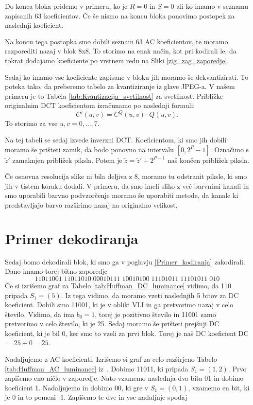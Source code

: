 \documentclass[a4paper,12pt,openright]{book}
\begin{document}
Do konca bloka pridemo v primeru, ko je $R = 0$ in $S = 0$ ali ko imamo v seznamu zapisanih 63 koeficientov. Če še nismo na koncu bloka ponovimo postopek za naslednji koeficient.\par
Na koncu tega postopka smo dobili seznam 63 AC koeficientov, te moramo razporediti nazaj v blok 8x8. To storimo na enak način, kot pri kodirali le, da tokrat dodajamo koeficiente po vrstnem redu na Sliki \ref{zig_zag_zaporedje}.\par
Sedaj ko imamo vse koeficiente zapisane v bloku jih moramo še dekvantizirati. To poteka tako, da preberemo tabelo za kvantiziranje iz glave JPEG-a. V našem primeru je to Tabela \ref{tab:Kvantizacija_svetilnost} za svetilnost. Približke originalnim DCT koeficientom izračunamo po naslednji formuli:
\begin{equation}
C'(u,v) = C^Q(u,v) \cdot Q(u,v).
\label{eq:dekvantizacija}
\end{equation}
To storimo za vse $u,v = 0,\ldots,7$.\par
Na tej tabeli se sedaj izvede inverzni DCT. Koeficientom, ki smo jih dobili moramo še prišteti zamik, da bodo ponovno na intervalu $\left[0,2^P-1\right]$. Označimo s $\widetilde{z}'$ zamaknjen približek piksla. Potem je $\widetilde{z} = \widetilde{z}' + 2^{P-1}$ naš končen približek piksla.\par
Če osnovna resolucija slike ni bila deljiva z 8, moramo tu odstranit piksle, ki smo jih v tistem koraku dodali.
V primeru, da smo imeli sliko z več barvnimi kanali in smo uporabili barvno podvzorčenje moramo še uporabiti metode, da kanale ki predstavljajo barvo razširimo nazaj na originalno velikost.

\section{Primer dekodiranja}
Sedaj bomo dekodirali blok, ki smo ga v poglavju \ref{Primer_kodiranja} zakodirali. Dano imamo torej bitno zaporedje
\begin{equation*}
11011001\;11011010\;00010111\;10010100\;11101011\;11101011\;010
\end{equation*}
Če si izrišemo graf za Tabelo \ref{tab:Huffman_DC_luminance} vidimo, da 110 pripada $S_1 = (5)$. Iz tega vidimo, da moramo vzeti naslednjih 5 bitov za DC koeficient. Dobili smo 11001, ki je v obliki VLI in ga pretvorimo nazaj v celo število. Vidimo, da ima $b_0=1$, torej je pozitivno število in 11001 samo pretvorimo v celo število, ki je 25. Sedaj moramo še prišteti prejšnji DC koeficient, ki je bil 0, ker smo to vzeli za prvi blok. Torej je naš DC koeficient DC $= 25+0 = 25$.\par
Nadaljujemo z AC koeficienti. Izrišemo si graf za celo razširjeno Tabelo \ref{tab:Huffman_AC_luminance} iz~\cite{ISO/IEC_10918-1}. Dobimo 11011, ki pripada $S_1 = (1, 2)$. Prvo zapišemo eno ničlo v zaporedje. Nato vzamemo naslednja dva bita 01 in dobimo koeficient 1. Nadaljujemo in dobimo 00, ki gre v $S_1 = (0, 1)$, vzamemo en bit, ki je 0 in to pomeni -1. Zapišemo te dve in vse nadaljnje spodaj
\end{document}
